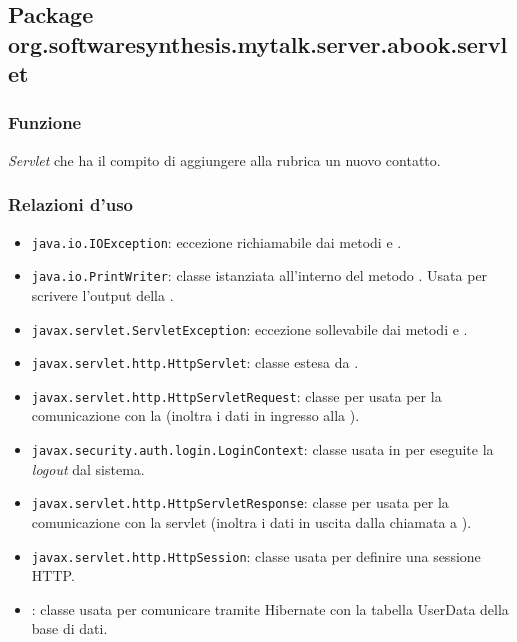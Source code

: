 \subsection{Package org.softwaresynthesis.mytalk.server.abook.servlet}\label{sec:call}



\subsubsection*{Funzione}
\textit{Servlet} che ha il compito di aggiungere alla rubrica un nuovo contatto.

\subsubsection*{Relazioni d'uso}

\begin{itemize}
	\item \texttt{java.io.IOException}: eccezione richiamabile dai metodi  e .
	\item \texttt{java.io.PrintWriter}: classe istanziata all'interno del metodo . Usata per scrivere l'output della .
	\item \texttt{javax.servlet.ServletException}: eccezione sollevabile dai metodi  e .
	\item \texttt{javax.servlet.http.HttpServlet}: classe estesa da .
	\item \texttt{javax.servlet.http.HttpServletRequest}:  classe per usata per la comunicazione con la  (inoltra i dati in ingresso alla ).
	\item \texttt{javax.security.auth.login.LoginContext}: classe usata in  per eseguite la \textit{logout} dal sistema.
	\item \texttt{javax.servlet.http.HttpServletResponse}: classe per usata per la comunicazione con la servlet (inoltra i dati in uscita dalla chiamata a ).
	\item \texttt{javax.servlet.http.HttpSession}: classe usata per definire una sessione HTTP.
	\item {}: classe usata per comunicare tramite Hibernate con la tabella UserData della base di dati.
\end{itemize}

